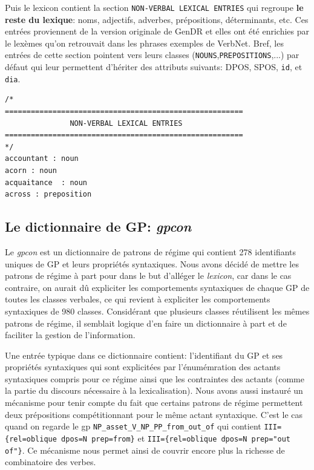 Puis le lexicon contient la section \texttt{NON-VERBAL LEXICAL ENTRIES} qui regroupe \textbf{le reste du lexique}: noms, adjectifs, adverbes, prépositions, déterminants, etc. Ces entrées proviennent de la version originale de GenDR \citep{lareau18} et elles ont été enrichies par le lexèmes qu'on retrouvait dans les phrases exemples de VerbNet. Bref, les entrées de cette section pointent vers leurs classes (\texttt{NOUNS},\texttt{PREPOSITIONS},...) par défaut qui leur permettent d'hériter des attributs suivants: \ac{DPOS}, \ac{SPOS}, \texttt{id}, et \texttt{dia}.

\begin{minipage}{\linewidth}
\begin{lstlisting}[language=XML, caption = Partie: Unités lexicales non-verbales]
/*
=======================================================
               NON-VERBAL LEXICAL ENTRIES     
=======================================================
*/
accountant : noun
acorn : noun
acquaitance  : noun
across : preposition
\end{lstlisting}
\end{minipage}

\subsection{Le dictionnaire de \ac{GP}: \emph{gpcon}}
Le \emph{gpcon} est un dictionnaire de patrons de régime qui contient 278 identifiants uniques de \ac{GP} et leurs propriétés syntaxiques. Nous avons décidé de mettre les patrons de régime à part pour dans le but d'alléger le \emph{lexicon}, car dans le cas contraire, on aurait dû expliciter les comportements syntaxiques de chaque \ac{GP} de toutes les classes verbales, ce qui revient à expliciter les comportements syntaxiques de 980 classes. Considérant que plusieurs classes réutilisent les mêmes patrons de régime, il semblait logique d'en faire un dictionnaire à part et de faciliter la gestion de l'information.

Une entrée typique dans ce dictionnaire contient: l'identifiant du \ac{GP} et ses propriétés syntaxiques qui sont explicitées par l'énumémration des actants syntaxiques compris pour ce régime ainsi que les contraintes des actants (comme la partie du discours nécessaire à la lexicalisation). Nous avons aussi instauré un mécanisme pour tenir compte du fait que certains patrons de régime permettent deux prépositions compétitionnant pour le même actant syntaxique. C'est le cas quand on regarde le gp \texttt{NP\_asset\_V\_NP\_PP\_from\_out\_of} qui contient \lstinline|III={rel=oblique dpos=N prep=from}| et \lstinline|III={rel=oblique dpos=N prep="out of"}|. Ce mécanisme nous permet ainsi de couvrir encore plus la richesse de combinatoire des verbes.

